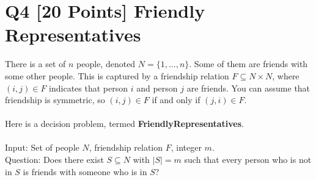 \documentclass[10pt]{article}
\begin{document}
\section*{Q4 [20 Points] Friendly Representatives}
There is a set of $n$ people, denoted $N = \{1, ... ,n\}$. Some of them are friends with some other people. This is captured by a friendship relation $F \subseteq N \times N$, where $(i, j) \in F$ indicates that person $i$ and person $j$ are friends. You can assume that friendship is symmetric, so $(i, j) \in F$ if and only if $(j, i) \in F$.\\
\\
Here is a decision problem, termed \textbf{FriendlyRepresentatives}.\\
\\
Input: Set of people $N$, friendship relation $F$, integer $m$.\\
Question: Does there exist $S \subseteq N$ with $|S| = m$ such that every person who is not in $S$ is friends with someone who is in $S$?
\end{document}
